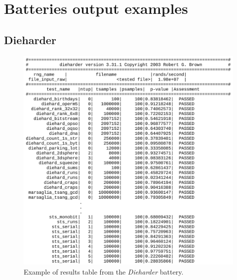 \documentclass[
  digital,     %
  oneside,     %
  nosansbold,  %
  nocolorbold, %
  nolof,         %
  nolot,         %
]{fithesis4}
\begin{document}
\appendix 

\chapter{Batteries output examples} \label{append:dieharder-output}
\section{Dieharder}

\begin{figure}[h]
  \begin{center}
    \includegraphics[width=12.5cm]{figures/outputs-appendix/dieharder.jpg}
  \end{center}
  \caption{Example of results table from the \emph{Dieharder} battery.}
  \label{fig:die_out}
\end{figure}

\newpage
\end{document}
